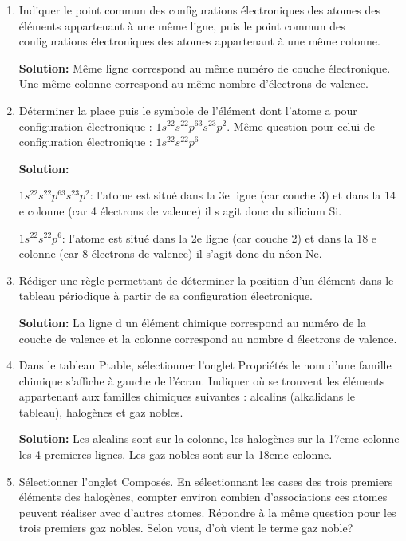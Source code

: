 \documentclass[french]{article}
\begin{document}
\begin{enumerate}
	\item Indiquer le point commun des configurations électroniques des atomes des éléments appartenant à une même ligne, puis le point commun des configurations électroniques des atomes appartenant à une même colonne.
	
	\textbf{Solution:} Même ligne correspond au même numéro de couche électronique. Une même colonne correspond au même nombre d'électrons de valence.

	\item Déterminer la place puis le symbole de l'élément dont l'atome a pour configuration électronique : $1s^22s^22p^63s^23p^2$. Même question pour celui de configuration électronique : $1s^22s^22p^6$
	
	\textbf{Solution:}
	
	$1s^22s^22p^63s^23p^2$: l'atome est situé dans la 3e ligne (car couche 3) et dans la 14 e colonne (car 4 électrons de valence) il s agit donc du silicium Si.

	$1s^22s^22p^6$: l'atome est situé dans la 2e ligne (car couche 2) et dans la 18 e colonne (car 8 électrons de valence) il s'agit donc du néon Ne.

	\item Rédiger une règle permettant de déterminer la position d'un élément dans le tableau périodique à partir de sa configuration électronique.
	
	\textbf{Solution:} La ligne d un élément chimique correspond au numéro de la couche de valence et la colonne correspond au	nombre d électrons de valence.

	\item Dans le tableau Ptable, sélectionner l'onglet \og{}Propriétés\fg{} le nom d'une famille chimique s'affiche à gauche de l'écran. Indiquer où se trouvent les éléments appartenant aux familles chimiques suivantes : alcalins (\og{}alkali\fg{}dans le tableau), halogènes et gaz nobles.
	
	\textbf{Solution:} Les alcalins sont sur la colonne, les halogènes sur la 17eme colonne les 4 premieres lignes. Les gaz nobles sont sur la 18eme colonne.
	


	\item Sélectionner l'onglet \og{}Composés\fg{}. En sélectionnant les cases des trois premiers éléments des halogènes, compter environ combien d'associations ces atomes peuvent réaliser avec d'autres atomes. Répondre à la même question pour les trois premiers gaz nobles. Selon vous, d'où vient le terme \og{}gaz noble\fg{}?
	

\end{enumerate}
\end{document}
